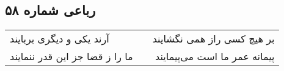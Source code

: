 \begin{center}
\section*{رباعی شماره ۵۸}
\label{sec:sh058}
\begin{longtable}{l p{0.5cm} r}
آرند یکی و دیگری بربایند
&&
بر هیچ کسی راز همی نگشایند
\\
ما را ز قضا جز این قدر ننمایند
&&
پیمانه عمر ما است می‌پیمایند
\\
\end{longtable}
\end{center}
